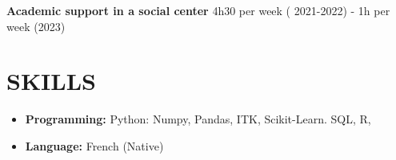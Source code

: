 \documentclass[a4paper,9pt]{extarticle}
\begin{document}
\textbf{Academic support in a social center}
4h30 per week ( 2021-2022) - 1h per week (2023)


\section*{SKILLS}
\begin{itemize}

    \item \textbf{Programming:} Python: Numpy, Pandas, ITK, Scikit-Learn.
    SQL, R,  %
    \item \textbf{Language: } French (Native)
  
\end{itemize}

\end{document}
